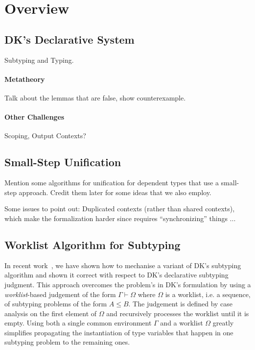 \section{Overview}


\subsection{DK's Declarative System}
Subtyping and Typing. 

\paragraph{Metatheory} Talk about the lemmas that are false, show counterexample. 

\paragraph{Other Challenges} Scoping, Output Contexts?

\subsection{Small-Step Unification} Mention some algorithms for unification for 
dependent types that use a small-step approach. Credit them later for some ideas that 
we also employ.

Some issues to point out: Duplicated contexts (rather than shared contexts), which make 
the formalization harder since requires ``synchronizing'' things ...

\subsection{Worklist Algorithm for Subtyping}

In recent work~\cite{itp2018}, we have shown how to mechanise a variant of DK's
subtyping algorithm and shown it correct with respect to DK's declarative
subtyping judgment. This approach overcomes the problem's in DK's formulation
by using a \emph{worklist}-based judgement of the form $\Gamma \vdash \Omega$
where $\Omega$ is a worklist, i.e. a sequence, of subtyping problems of the
form $A \leq B$.  The judgement is defined by case analysis on the first
element of $\Omega$ and recursively processes the worklist until it is empty.
Using both a single common environment $\Gamma$ and a worklist $\Omega$ greatly
simplifies propagating the instantiation of type variables that happen in one
subtyping problem to the remaining ones.

